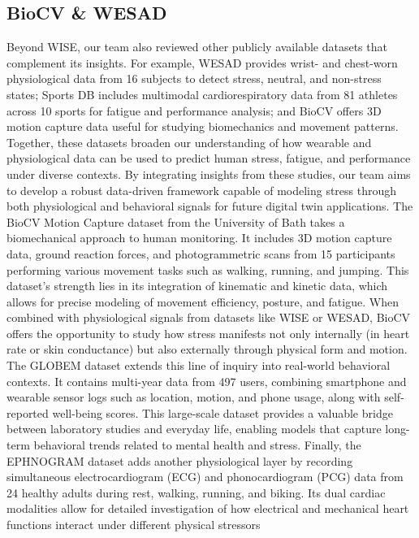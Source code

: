 \documentclass[12pt,letterpaper]{article}
\begin{document}
\subsection{BioCV \& WESAD}
Beyond WISE, our team also reviewed other publicly available datasets that complement its insights. For example, WESAD \citep{schmidt2018wesad} provides wrist- and chest-worn physiological data from 16 subjects to detect stress, neutral, and non-stress states; Sports DB \citep{soto2021sportsdb} includes multimodal cardiorespiratory data from 81 athletes across 10 sports for fatigue and performance analysis; and BioCV \citep{moore2020biocv} offers 3D motion capture data useful for studying biomechanics and movement patterns. Together, these datasets broaden our understanding of how wearable and physiological data can be used to predict human stress, fatigue, and performance under diverse contexts. By integrating insights from these studies, our team aims to develop a robust data-driven framework capable of modeling stress through both physiological and behavioral signals for future digital twin applications. The BioCV Motion Capture dataset from the University of Bath takes a biomechanical approach to human monitoring. It includes 3D motion capture data, ground reaction forces, and photogrammetric scans from 15 participants performing various movement tasks such as walking, running, and jumping. This dataset’s strength lies in its integration of kinematic and kinetic data, which allows for precise modeling of movement efficiency, posture, and fatigue. When combined with physiological signals from datasets like WISE or WESAD, BioCV offers the opportunity to study how stress manifests not only internally (in heart rate or skin conductance) but also externally through physical form and motion.  The GLOBEM dataset \citep{zhao2023globem} extends this line of inquiry into real-world behavioral contexts. It contains multi-year data from 497 users, combining smartphone and wearable sensor logs such as location, motion, and phone usage, along with self-reported well-being scores. This large-scale dataset provides a valuable bridge between laboratory studies and everyday life, enabling models that capture long-term behavioral trends related to mental health and stress. Finally, the EPHNOGRAM dataset adds another physiological layer by recording simultaneous electrocardiogram (ECG) and phonocardiogram (PCG) data from 24 healthy adults during rest, walking, running, and biking. Its dual cardiac modalities allow for detailed investigation of how electrical and mechanical heart functions interact under different physical stressors
\end{document}

